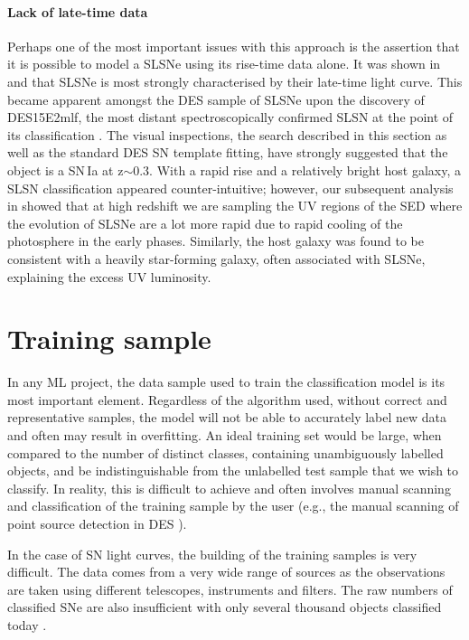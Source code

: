 \paragraph{Lack of late-time data}
Perhaps one of the most important issues with this approach is the assertion that it is possible to model a SLSNe using its rise-time data alone. It was shown in \citet{Inserra2013} and \citet{Inserra2018a} that SLSNe is most strongly characterised by their late-time light curve. This became apparent amongst the DES sample of SLSNe upon the discovery of DES15E2mlf, the most distant spectroscopically confirmed SLSN at the point of its classification \citep{Pan2017}. The visual inspections, the search described in this section as well as the standard DES SN template fitting, have strongly suggested that the object is a SN\,Ia at z$\sim$0.3. With a rapid rise and a relatively bright host galaxy, a SLSN classification appeared counter-intuitive; however, our subsequent analysis in \citet{Pan2017} showed that at high redshift we are sampling the UV regions of the SED where the evolution of SLSNe are a lot more rapid due to rapid cooling of the photosphere in the early phases. Similarly, the host galaxy was found to be consistent with a heavily star-forming galaxy, often associated with SLSNe, explaining the excess UV luminosity.

\section{Training sample} \label{sec:TrainingSample}
In any ML project, the data sample used to train the classification model is its most important element. Regardless of the algorithm used, without correct and representative samples, the model will not be able to accurately label new data and often may result in overfitting. An ideal training set would be large, when compared to the number of distinct classes, containing unambiguously labelled objects, and be indistinguishable from the unlabelled test sample that we wish to classify. In reality, this is difficult to achieve and often involves manual scanning and classification of the training sample by the user (e.g., the manual scanning of point source detection in DES \citep[][and similar studies]{Goldstein2015}).

In the case of SN light curves, the building of the training samples is very difficult. The data comes from a very wide range of sources as the observations are taken using different telescopes, instruments and filters. The raw numbers of classified SNe are also insufficient with only several thousand objects classified today \citep{Alsabti2017}.

